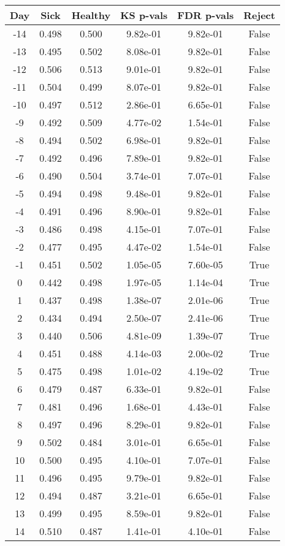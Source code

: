 \begin{tabular}{c|c|c|c|c|c}
Day &  Sick & Healthy &  KS p-vals & FDR p-vals & Reject\\
\hline
-14 & 0.498 &   0.500 &   9.82e-01 &   9.82e-01 &  False\\
-13 & 0.495 &   0.502 &   8.08e-01 &   9.82e-01 &  False\\
-12 & 0.506 &   0.513 &   9.01e-01 &   9.82e-01 &  False\\
-11 & 0.504 &   0.499 &   8.07e-01 &   9.82e-01 &  False\\
-10 & 0.497 &   0.512 &   2.86e-01 &   6.65e-01 &  False\\
 -9 & 0.492 &   0.509 &   4.77e-02 &   1.54e-01 &  False\\
 -8 & 0.494 &   0.502 &   6.98e-01 &   9.82e-01 &  False\\
 -7 & 0.492 &   0.496 &   7.89e-01 &   9.82e-01 &  False\\
 -6 & 0.490 &   0.504 &   3.74e-01 &   7.07e-01 &  False\\
 -5 & 0.494 &   0.498 &   9.48e-01 &   9.82e-01 &  False\\
 -4 & 0.491 &   0.496 &   8.90e-01 &   9.82e-01 &  False\\
 -3 & 0.486 &   0.498 &   4.15e-01 &   7.07e-01 &  False\\
 -2 & 0.477 &   0.495 &   4.47e-02 &   1.54e-01 &  False\\
 -1 & 0.451 &   0.502 &   1.05e-05 &   7.60e-05 &   True\\
  0 & 0.442 &   0.498 &   1.97e-05 &   1.14e-04 &   True\\
  1 & 0.437 &   0.498 &   1.38e-07 &   2.01e-06 &   True\\
  2 & 0.434 &   0.494 &   2.50e-07 &   2.41e-06 &   True\\
  3 & 0.440 &   0.506 &   4.81e-09 &   1.39e-07 &   True\\
  4 & 0.451 &   0.488 &   4.14e-03 &   2.00e-02 &   True\\
  5 & 0.475 &   0.498 &   1.01e-02 &   4.19e-02 &   True\\
  6 & 0.479 &   0.487 &   6.33e-01 &   9.82e-01 &  False\\
  7 & 0.481 &   0.496 &   1.68e-01 &   4.43e-01 &  False\\
  8 & 0.497 &   0.496 &   8.29e-01 &   9.82e-01 &  False\\
  9 & 0.502 &   0.484 &   3.01e-01 &   6.65e-01 &  False\\
 10 & 0.500 &   0.495 &   4.10e-01 &   7.07e-01 &  False\\
 11 & 0.496 &   0.495 &   9.79e-01 &   9.82e-01 &  False\\
 12 & 0.494 &   0.487 &   3.21e-01 &   6.65e-01 &  False\\
 13 & 0.499 &   0.495 &   8.59e-01 &   9.82e-01 &  False\\
 14 & 0.510 &   0.487 &   1.41e-01 &   4.10e-01 &  False\\
\end{tabular}